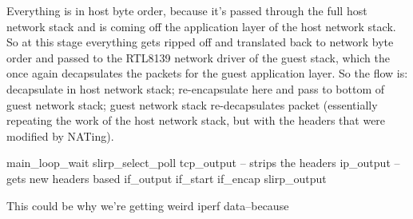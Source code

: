 \documentclass[11pt,pdftex,twocolumn]{article}
\begin{document}
Everything is in host byte order, because it's passed through the full host network stack and is coming off the application layer of the host network stack. So at this stage everything gets ripped off and translated back to network byte order and passed to the RTL8139 network driver of the guest stack, which the once again decapsulates the packets for the guest application layer. So the flow is: decapsulate in host network stack; re-encapsulate here and pass to bottom of guest network stack; guest network stack re-decapsulates packet (essentially repeating the work of the host network stack, but with the headers that were modified by NATing). 

main_loop_wait
slirp_select_poll
tcp_output -- strips the headers
ip_output -- gets new headers based 
if_output
if_start
if_encap
slirp_output

This could be why we're getting weird iperf data--because 








{\footnotesize 
}
\end{document}
